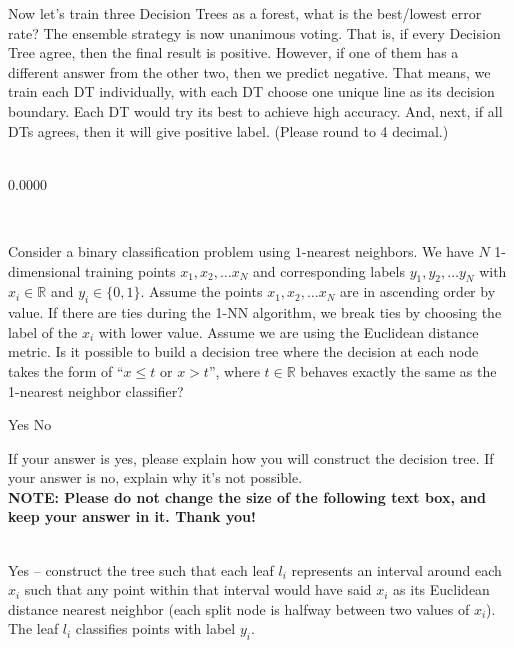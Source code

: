\documentclass[11pt,addpoints,answers]{exam}
\numberwithin{equation}{section} %
\numberwithin{figure}{section} %
\numberwithin{table}{section} %
\begin{document}
\begin{questions}
\begin{parts}
    

\newpage
    \item Now let's train three Decision Trees as a forest, what is the best/lowest error rate? The ensemble strategy is now unanimous voting. That is, if every Decision Tree agree, then the final result is positive. However, if one of them has a different answer from the other two, then we predict negative. That means, we train each DT individually, with each DT choose one unique line as its decision boundary. Each DT would try its best to achieve high accuracy. And, next, if all DTs agrees, then it will give positive label. (Please round to 4 decimal.) \\ \\
    \begin{tcolorbox}[fit,height=1cm, width=15cm, blank, borderline={1pt}{-2pt}, nobeforeafter]
	    0.0000
    \end{tcolorbox} \\
    
    \end{parts}
    
    \question[2] Consider a binary classification problem using $1$-nearest neighbors. We have $N$ 1-dimensional training points $x_1, x_2, \ldots x_N$ and corresponding labels $y_1, y_2, \ldots y_N$ with $x_i \in \mathbb{R}$ and $y_i \in \{0, 1\}$. Assume the points $x_1, x_2, \ldots x_N$ are in ascending order by value. If there are ties during the 1-NN algorithm, we break ties by choosing the label of the $x_i$ with lower value. Assume we are using the Euclidean distance metric. Is it possible to build a decision tree where the decision at each node takes the form of “$x \leq t$ or $x > t$”, where $t \in \mathbb{R}$ behaves exactly the same as the 1-nearest neighbor classifier?
    
    \begin{checkboxes}
        \CorrectChoice Yes
        \choice No
    \end{checkboxes}
     If your answer is yes, please explain how you will construct the decision tree. If your answer is no, explain why it’s not possible.  \\
   
    \textbf{NOTE: Please do not change the size of the following text box, and keep your answer in it. Thank you!} \\ \\
    \begin{tcolorbox}[fit,height=4cm, width=15cm, blank, borderline={1pt}{-2pt},nobeforeafter, top=2pt, left=2pt, right=2pt, bottom=2pt]
    \large
	    Yes -- construct the tree such that each leaf $l_i$ represents an interval around each $x_i$ such that any point within that interval would have said $x_i$ as its Euclidean distance nearest neighbor (each split node is halfway between two values of $x_i$). The leaf $l_i$ classifies points with label $y_i$. 

    \end{tcolorbox} \\
    
    

    

\end{questions}
\end{document}
